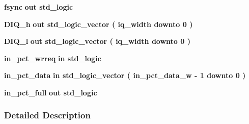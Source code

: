 \begin{DoxyCompactItemize}
\item 
{\bf fsync}  {\bfseries {\bfseries \textcolor{keywordflow}{out}\textcolor{vhdlchar}{ }}} {\bfseries \textcolor{comment}{std\+\_\+logic}\textcolor{vhdlchar}{ }} 
\item 
{\bf D\+I\+Q\+\_\+h}  {\bfseries {\bfseries \textcolor{keywordflow}{out}\textcolor{vhdlchar}{ }}} {\bfseries \textcolor{comment}{std\+\_\+logic\+\_\+vector}\textcolor{vhdlchar}{ }\textcolor{vhdlchar}{(}\textcolor{vhdlchar}{ }\textcolor{vhdlchar}{ }\textcolor{vhdlchar}{ }\textcolor{vhdlchar}{ }{\bfseries {\bf iq\+\_\+width}} \textcolor{vhdlchar}{ }\textcolor{keywordflow}{downto}\textcolor{vhdlchar}{ }\textcolor{vhdlchar}{ } \textcolor{vhdldigit}{0} \textcolor{vhdlchar}{ }\textcolor{vhdlchar}{)}\textcolor{vhdlchar}{ }} 
\item 
{\bf D\+I\+Q\+\_\+l}  {\bfseries {\bfseries \textcolor{keywordflow}{out}\textcolor{vhdlchar}{ }}} {\bfseries \textcolor{comment}{std\+\_\+logic\+\_\+vector}\textcolor{vhdlchar}{ }\textcolor{vhdlchar}{(}\textcolor{vhdlchar}{ }\textcolor{vhdlchar}{ }\textcolor{vhdlchar}{ }\textcolor{vhdlchar}{ }{\bfseries {\bf iq\+\_\+width}} \textcolor{vhdlchar}{ }\textcolor{keywordflow}{downto}\textcolor{vhdlchar}{ }\textcolor{vhdlchar}{ } \textcolor{vhdldigit}{0} \textcolor{vhdlchar}{ }\textcolor{vhdlchar}{)}\textcolor{vhdlchar}{ }} 
\item 
{\bf in\+\_\+pct\+\_\+wrreq}  {\bfseries {\bfseries \textcolor{keywordflow}{in}\textcolor{vhdlchar}{ }}} {\bfseries \textcolor{comment}{std\+\_\+logic}\textcolor{vhdlchar}{ }} 
\item 
{\bf in\+\_\+pct\+\_\+data}  {\bfseries {\bfseries \textcolor{keywordflow}{in}\textcolor{vhdlchar}{ }}} {\bfseries \textcolor{comment}{std\+\_\+logic\+\_\+vector}\textcolor{vhdlchar}{ }\textcolor{vhdlchar}{(}\textcolor{vhdlchar}{ }\textcolor{vhdlchar}{ }\textcolor{vhdlchar}{ }\textcolor{vhdlchar}{ }{\bfseries {\bf in\+\_\+pct\+\_\+data\+\_\+w}} \textcolor{vhdlchar}{-\/}\textcolor{vhdlchar}{ } \textcolor{vhdldigit}{1} \textcolor{vhdlchar}{ }\textcolor{keywordflow}{downto}\textcolor{vhdlchar}{ }\textcolor{vhdlchar}{ } \textcolor{vhdldigit}{0} \textcolor{vhdlchar}{ }\textcolor{vhdlchar}{)}\textcolor{vhdlchar}{ }} 
\item 
{\bf in\+\_\+pct\+\_\+full}  {\bfseries {\bfseries \textcolor{keywordflow}{out}\textcolor{vhdlchar}{ }}} {\bfseries \textcolor{comment}{std\+\_\+logic}\textcolor{vhdlchar}{ }} 
\end{DoxyCompactItemize}


\subsubsection{Detailed Description}


